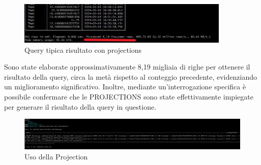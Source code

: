       \begin{figure}[H]
        \centering
        \includegraphics[width=0.9\textwidth]{../Images/SpecificaTecnica/ConProjectionRisultato.jpg}
        \caption{Query tipica risultato con projections}
        \label{fig:ProjectionsQueryWith}
      \end{figure}   
  Sono state elaborate approssimativamente 8,19 migliaia di righe per ottenere il risultato della query, circa la metà rispetto al conteggio precedente, evidenziando un miglioramento significativo. Inoltre, mediante un'interrogazione specifica è possibile confermare che le PROJECTIONS sono state effettivamente impiegate per generare il risultato della query in questione.
\begin{figure}[H]
    \centering
    \includegraphics[width=1\textwidth]{../Images/SpecificaTecnica/ProjectionUsedByClickHouse.jpg}
    \caption{Uso della Projection}
    \label{fig:ProjectionsUsed}
\end{figure}

